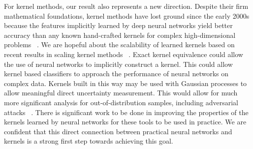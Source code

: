 For kernel methods, our result also represents a new direction. Despite their firm mathematical foundations, kernel methods have lost ground since the early 2000s because the features implicitly learned by deep neural networks yield better accuracy than any known hand-crafted kernels for complex high-dimensional problems ~\citep{NIPS2005_663772ea}. 
We are hopeful about the scalability of learned kernels based on recent results in scaling kernel methods ~\citep{snelson2005sparse}. 
Exact kernel equivalence could allow the use of neural networks to implicitly construct a kernel. 
This could allow kernel based classifiers to approach the performance of neural networks on complex data. 
Kernels built in this way may be used with Gaussian processes to allow meaningful direct uncertainty measurement. 
This would allow for much more significant analysis for out-of-distribution samples, including adversarial attacks ~\citep{szegedy2013intriguing, ilyas2019adversarial}. 
There is significant work to be done in improving the properties of the kernels learned by neural networks for these tools to be used in practice.
We are confident that this direct connection between practical neural networks and kernels is a strong first step towards achieving this goal.



